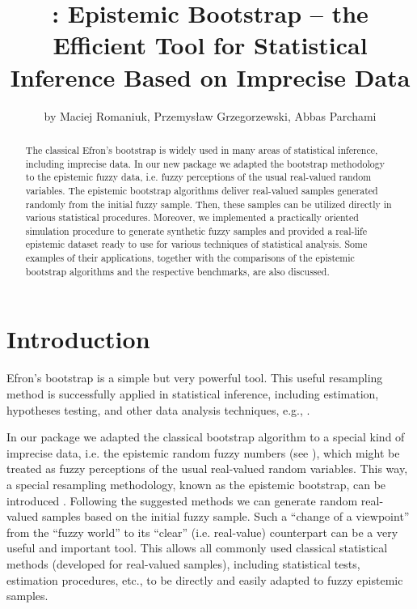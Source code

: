 

  \title{: Epistemic Bootstrap -- the Efficient Tool for Statistical Inference Based on Imprecise Data}
  \author{by Maciej Romaniuk, Przemys{\l}aw Grzegorzewski, Abbas Parchami}
  
  \maketitle
  
  \begin{abstract}
  The classical Efron's bootstrap is widely used in many areas of statistical inference, including imprecise data.
  In our new package  we adapted the bootstrap methodology to the epistemic fuzzy data, i.e. fuzzy perceptions of the usual real-valued random variables.
  The epistemic bootstrap algorithms deliver real-valued samples generated randomly from the initial fuzzy sample.
  Then, these samples can be utilized directly in various statistical procedures.
  Moreover, we implemented a practically oriented simulation procedure to generate synthetic fuzzy samples and provided a real-life epistemic dataset ready to use for various techniques of statistical analysis.
  Some examples of their applications, together with the comparisons of the epistemic bootstrap algorithms and the respective benchmarks, are also discussed.
  \end{abstract}




\section{Introduction} 
\label{intro}

Efron's bootstrap \citep{EfroTibs93} is a simple but very powerful tool. This useful resampling method is successfully applied in statistical inference, including estimation, hypotheses testing, and other data analysis techniques, e.g., \cite{davison_hinkley_1997,ISLR,romaniuk2019}.

In our package  we adapted the classical bootstrap algorithm to a special kind of imprecise data, i.e. the epistemic random fuzzy numbers (see \cite{Couso2014}), which might be treated as fuzzy perceptions of the usual real-valued random variables.
This way, a special resampling methodology, known as the epistemic bootstrap, can be introduced \citep{grzegorzewski2021,10.1007/978-3-031-08974-9_39,pgmr2022}.
Following the suggested methods we can generate random real-valued samples based on the initial fuzzy sample.
Such a ``change of a viewpoint'' from the ``fuzzy world'' to its ``clear'' (i.e. real-value) counterpart can be a very useful and important tool.
This allows all commonly used classical statistical methods (developed for real-valued samples), including statistical tests, estimation procedures, etc., to be directly and easily adapted to fuzzy epistemic samples.





